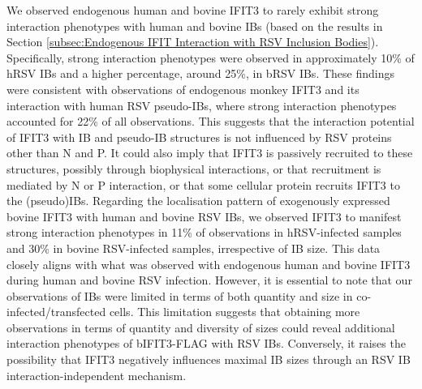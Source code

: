 We observed endogenous human and bovine IFIT3 to rarely exhibit strong interaction phenotypes with human and bovine IBs (based on the results in Section \ref{subsec:Endogenous IFIT Interaction with RSV Inclusion Bodies}). Specifically, strong interaction phenotypes were observed in approximately 10\% of hRSV IBs and a higher percentage, around 25\%, in bRSV IBs. These findings were consistent with observations of endogenous monkey IFIT3 and its interaction with human RSV pseudo-IBs, where strong interaction phenotypes accounted for 22\% of all observations. This suggests that the interaction potential of IFIT3 with IB and pseudo-IB structures is not influenced by RSV proteins other than N and P. It could also imply that IFIT3 is passively recruited to these structures, possibly through biophysical interactions, or that recruitment is mediated by N or P interaction, or that some cellular protein recruits IFIT3 to the (pseudo)IBs. Regarding the localisation pattern of exogenously expressed bovine IFIT3 with human and bovine RSV IBs, we observed IFIT3 to manifest strong interaction phenotypes in 11\% of observations in hRSV-infected samples and 30\% in bovine RSV-infected samples, irrespective of IB size. This data closely aligns with what was observed with endogenous human and bovine IFIT3 during human and bovine RSV infection. However, it is essential to note that our observations of IBs were limited in terms of both quantity and size in co-infected/transfected cells. This limitation suggests that obtaining more observations in terms of quantity and diversity of sizes could reveal additional interaction phenotypes of bIFIT3-FLAG with RSV IBs. Conversely, it raises the possibility that IFIT3 negatively influences maximal IB sizes through an RSV IB interaction-independent mechanism.

